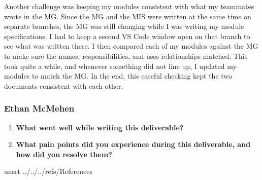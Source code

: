 \documentclass[10pt, titlepage]{article}
\begin{document}
\begin{enumerate}
    Another challenge was keeping my modules consistent with what my
    teammates wrote in the MG. Since the MG and the MIS were written at the
    same time on separate branches, the MG was still changing while I was
    writing my module specifications. I had to keep a second VS Code
    window open on that branch to see what was written there. I then
    compared each of my modules against the MG to make sure the names,
    responsibilities, and uses relationships matched. This took quite a
    while, and whenever something did not line up, I updated my modules to
    match the MG. In the end, this careful checking kept the two documents
    consistent with each other.

\end{enumerate}

\subsubsection*{Ethan McMehen}

\begin{enumerate}
\item \textbf{What went well while writing this deliverable?}


\item \textbf{What pain points did you experience during this deliverable,
    and how did you resolve them?}

\end{enumerate}

\newpage
 {unsrt}
 {../../../refs/References}
\end{document}
